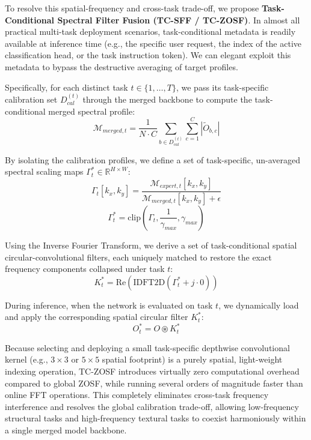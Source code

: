 \documentclass{article}
\theoremstyle{plain}
\theoremstyle{definition}
\theoremstyle{remark}
\begin{document}
To resolve this spatial-frequency and cross-task trade-off, we propose \textbf{Task-Conditional Spectral Filter Fusion (TC-SFF / TC-ZOSF)}. In almost all practical multi-task deployment scenarios, task-conditional metadata is readily available at inference time (e.g., the specific user request, the index of the active classification head, or the task instruction token). We can elegant exploit this metadata to bypass the destructive averaging of target profiles.

Specifically, for each distinct task $t \in \{1, \dots, T\}$, we pass its task-specific calibration set $D^{(t)}_{cal}$ through the merged backbone to compute the task-conditional merged spectral profile:
\begin{equation}
    \mathcal{M}_{merged, t} = \frac{1}{N \cdot C} \sum_{b \in D^{(t)}_{cal}} \sum_{c=1}^C |\tilde{O}_{b,c}|
\end{equation}

By isolating the calibration profiles, we define a set of task-specific, un-averaged spectral scaling maps $\Gamma^*_t \in \mathbb{R}^{H \times W}$:
\begin{equation}
    \Gamma_t[k_x, k_y] = \frac{\mathcal{M}_{expert, t}[k_x, k_y]}{\mathcal{M}_{merged, t}[k_x, k_y] + \epsilon}
\end{equation}
\begin{equation}
    \Gamma^*_t = \text{clip}\left(\Gamma_t, \frac{1}{\gamma_{max}}, \gamma_{max}\right)
\end{equation}

Using the Inverse Fourier Transform, we derive a set of task-conditional spatial circular-convolutional filters, each uniquely matched to restore the exact frequency components collapsed under task $t$:
\begin{equation}
    K^*_t = \text{Re}\left(\text{IDFT2D}\left(\Gamma^*_t + j \cdot 0\right)\right)
\end{equation}

During inference, when the network is evaluated on task $t$, we dynamically load and apply the corresponding spatial circular filter $K^*_t$:
\begin{equation}
    O^*_t = O \circledast K^*_t
\end{equation}

Because selecting and deploying a small task-specific depthwise convolutional kernel (e.g., $3 \times 3$ or $5 \times 5$ spatial footprint) is a purely spatial, light-weight indexing operation, TC-ZOSF introduces virtually zero computational overhead compared to global ZOSF, while running several orders of magnitude faster than online FFT operations. This completely eliminates cross-task frequency interference and resolves the global calibration trade-off, allowing low-frequency structural tasks and high-frequency textural tasks to coexist harmoniously within a single merged model backbone.
\end{document}
